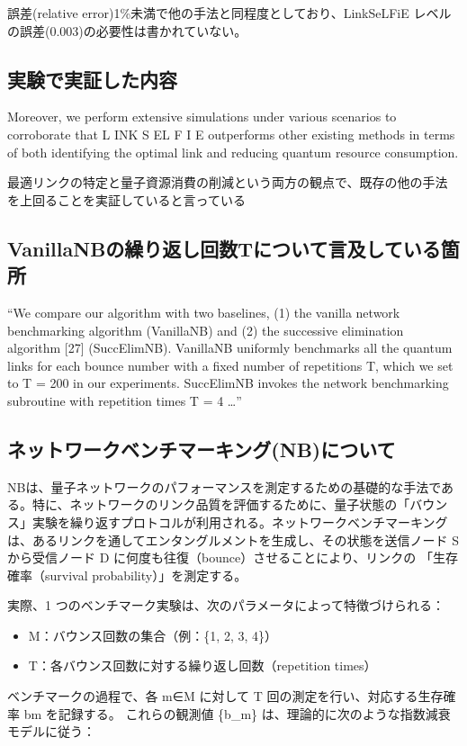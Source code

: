 \documentclass[conference]{IEEEtran}
\begin{document}
誤差(relative error)1\%未満で他の手法と同程度としており、LinkSeLFiE
レベルの誤差(0.003)の必要性は書かれていない。


\subsection{実験で実証した内容}
\label{sec:org865c527}
Moreover, we perform extensive simulations under
various scenarios to corroborate that L INK S EL F I E outperforms
other existing methods in terms of both identifying the optimal
link and reducing quantum resource consumption.

最適リンクの特定と量子資源消費の削減という両方の観点で、既存の他の手法
を上回ることを実証していると言っている

\subsection{VanillaNBの繰り返し回数Tについて言及している箇所}
\label{sec:orgdb2bfd1}
“We compare our algorithm with two baselines, (1) the vanilla network
benchmarking algorithm (VanillaNB) and (2) the successive elimination
algorithm [27] (SuccElimNB).  VanillaNB uniformly benchmarks all the
quantum links for each bounce number with a fixed number of
repetitions T, which we set to T = 200 in our experiments.  SuccElimNB
invokes the network benchmarking subroutine with repetition times T =
4 …”




\subsection{ネットワークベンチマーキング(NB)について}
\label{sec:orge50494e}
NBは、量子ネットワークのパフォーマンスを測定するための基礎的な手法であ
る。特に、ネットワークのリンク品質を評価するために、量子状態の「バウン
ス」実験を繰り返すプロトコルが利用される。ネットワークベンチマーキング
は、あるリンクを通してエンタングルメントを生成し、その状態を送信ノード
S から受信ノード D に何度も往復（bounce）させることにより、リンクの
「生存確率（survival probability）」を測定する。

実際、1 つのベンチマーク実験は、次のパラメータによって特徴づけられる：
\begin{itemize}
\item M：バウンス回数の集合（例：\{1, 2, 3, 4\}）
\item T：各バウンス回数に対する繰り返し回数（repetition times）
\end{itemize}
ベンチマークの過程で、各 m∈M に対して T 回の測定を行い、対応する生存確
率 bm を記録する。
これらの観測値 \{b\_m\} は、理論的に次のような指数減衰モデルに従う：
\end{document}
